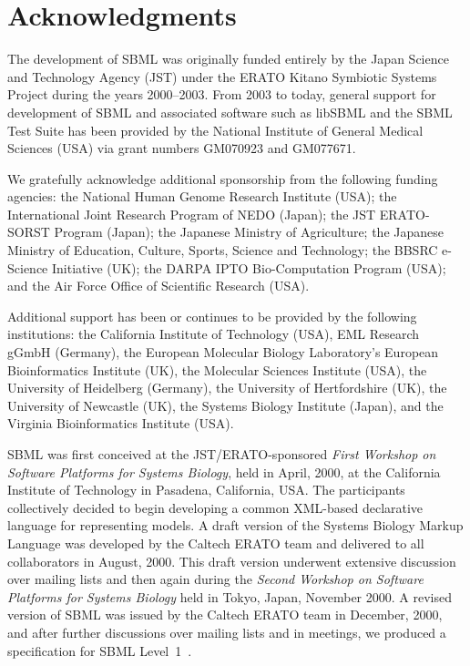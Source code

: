 
\section{Acknowledgments}
\label{sec:acknowledgements}
\label{sec:acknowledgments}

\begin{blockChanged}

The development of SBML was originally funded entirely by the
Japan Science and Technology Agency (JST) under the ERATO Kitano
Symbiotic Systems Project during the years 2000--2003.  From 2003
to today, general support for development of SBML and associated
software such as libSBML and the SBML Test Suite has been provided
by the National Institute of General Medical Sciences (USA) via
grant numbers GM070923 and GM077671.

We gratefully acknowledge additional sponsorship from the
following funding agencies: the National Human Genome Research
Institute (USA); the International Joint Research Program of NEDO
(Japan); the JST ERATO-SORST Program (Japan); the Japanese
Ministry of Agriculture; the Japanese Ministry of Education,
Culture, Sports, Science and Technology; the BBSRC e-Science
Initiative (UK); the DARPA IPTO Bio-Computation Program (USA); and
the Air Force Office of Scientific Research (USA).

Additional support has been or continues to be provided by the
following institutions: the California Institute of Technology
(USA), EML Research gGmbH (Germany), the European Molecular
Biology Laboratory's European Bioinformatics Institute (UK), the
Molecular Sciences Institute (USA), the University of Heidelberg
(Germany), the University of Hertfordshire (UK), the University of
Newcastle (UK), the Systems Biology Institute (Japan), and the
Virginia Bioinformatics Institute (USA).

\end{blockChanged}

SBML was first conceived at the JST/ERATO-sponsored \emph{First
  Workshop on Software Platforms for Systems Biology}, held in
April, 2000, at the California Institute of Technology in
Pasadena, California, USA.  The participants collectively decided
to begin developing a common XML-based declarative language for
representing models.  A draft version of the Systems Biology
Markup Language was developed by the Caltech ERATO team and
delivered to all collaborators in August, 2000.  This draft
version underwent extensive discussion over mailing lists and then
again during the \emph{Second Workshop on Software Platforms for
  Systems Biology} held in Tokyo, Japan, November 2000.  A revised
version of SBML was issued by the Caltech ERATO team in December,
2000, and after further discussions over mailing lists and in
meetings, we produced a specification for SBML
Level~1~\citep{hucka:2001}.

